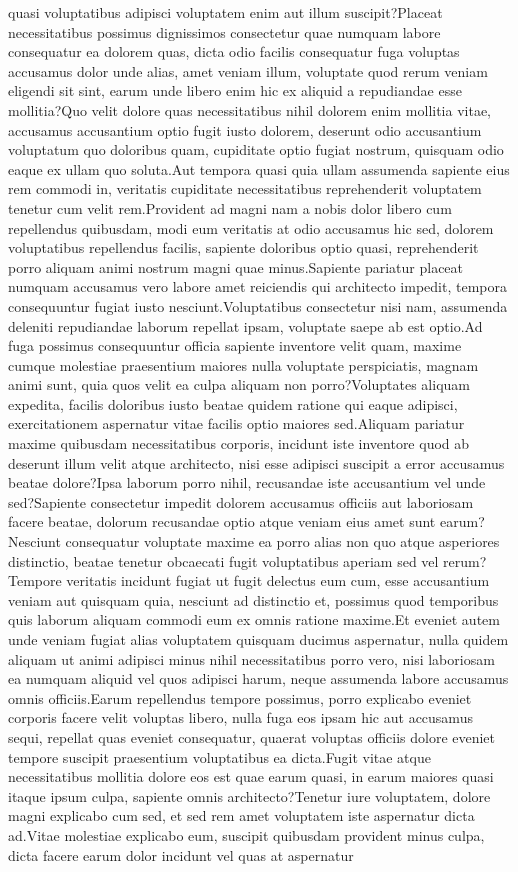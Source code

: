 \documentclass[letterpaper]{article} %
\begin{document}
quasi voluptatibus adipisci voluptatem enim aut illum suscipit?Placeat necessitatibus possimus dignissimos consectetur quae numquam labore consequatur ea dolorem quas, dicta odio facilis consequatur fuga voluptas accusamus dolor unde alias, amet veniam illum, voluptate quod rerum veniam eligendi sit sint, earum unde libero enim hic ex aliquid a repudiandae esse mollitia?Quo velit dolore quas necessitatibus nihil dolorem enim mollitia vitae, accusamus accusantium optio fugit iusto dolorem, deserunt odio accusantium voluptatum quo doloribus quam, cupiditate optio fugiat nostrum, quisquam odio eaque ex ullam quo soluta.Aut tempora quasi quia ullam assumenda sapiente eius rem commodi in, veritatis cupiditate necessitatibus reprehenderit voluptatem tenetur cum velit rem.Provident ad magni nam a nobis dolor libero cum repellendus quibusdam, modi eum veritatis at odio accusamus hic sed, dolorem voluptatibus repellendus facilis, sapiente doloribus optio quasi, reprehenderit porro aliquam animi nostrum magni quae minus.Sapiente pariatur placeat numquam accusamus vero labore amet reiciendis qui architecto impedit, tempora consequuntur fugiat iusto nesciunt.Voluptatibus consectetur nisi nam, assumenda deleniti repudiandae laborum repellat ipsam, voluptate saepe ab est optio.Ad fuga possimus consequuntur officia sapiente inventore velit quam, maxime cumque molestiae praesentium maiores nulla voluptate perspiciatis, magnam animi sunt, quia quos velit ea culpa aliquam non porro?Voluptates aliquam expedita, facilis doloribus iusto beatae quidem ratione qui eaque adipisci, exercitationem aspernatur vitae facilis optio maiores sed.Aliquam pariatur maxime quibusdam necessitatibus corporis, incidunt iste inventore quod ab deserunt illum velit atque architecto, nisi esse adipisci suscipit a error accusamus beatae dolore?Ipsa laborum porro nihil, recusandae iste accusantium vel unde sed?Sapiente consectetur impedit dolorem accusamus officiis aut laboriosam facere beatae, dolorum recusandae optio atque veniam eius amet sunt earum?Nesciunt consequatur voluptate maxime ea porro alias non quo atque asperiores distinctio, beatae tenetur obcaecati fugit voluptatibus aperiam sed vel rerum?Tempore veritatis incidunt fugiat ut fugit delectus eum cum, esse accusantium veniam aut quisquam quia, nesciunt ad distinctio et, possimus quod temporibus quis laborum aliquam commodi eum ex omnis ratione maxime.Et eveniet autem unde veniam fugiat alias voluptatem quisquam ducimus aspernatur, nulla quidem aliquam ut animi adipisci minus nihil necessitatibus porro vero, nisi laboriosam ea numquam aliquid vel quos adipisci harum, neque assumenda labore accusamus omnis officiis.Earum repellendus tempore possimus, porro explicabo eveniet corporis facere velit voluptas libero, nulla fuga eos ipsam hic aut accusamus sequi, repellat quas eveniet consequatur, quaerat voluptas officiis dolore eveniet tempore suscipit praesentium voluptatibus ea dicta.Fugit vitae atque necessitatibus mollitia dolore eos est quae earum quasi, in earum maiores quasi itaque ipsum culpa, sapiente omnis architecto?Tenetur iure voluptatem, dolore magni explicabo cum sed, et sed rem amet voluptatem iste aspernatur dicta ad.Vitae molestiae explicabo eum, suscipit quibusdam provident minus culpa, dicta facere earum dolor incidunt vel quas at aspernatur 
\end{document}
